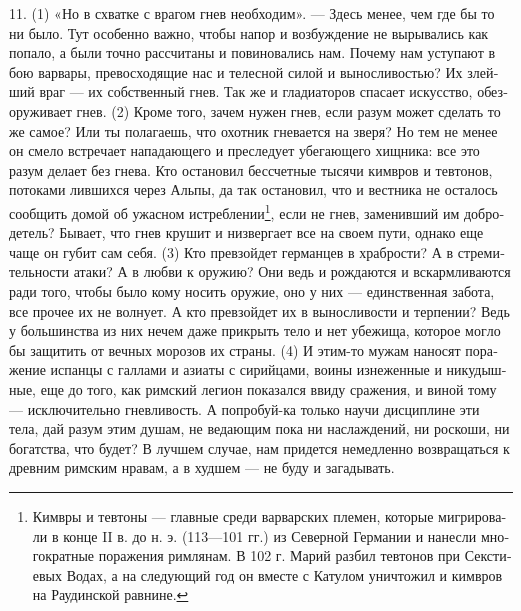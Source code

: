 11. (1) «Но в схват­ке с вра­гом гнев необ­хо­дим». --- Здесь менее, чем где бы то ни было. Тут осо­бен­но важ­но, чтобы напор и воз­буж­де­ние не выры­ва­лись как попа­ло, а были точ­но рас­счи­та­ны и пови­но­ва­лись нам. Поче­му нам усту­па­ют в бою вар­ва­ры, пре­вос­хо­дя­щие нас и телес­ной силой и вынос­ли­во­стью? Их злей­ший враг --- их соб­ст­вен­ный гнев. Так же и гла­ди­а­то­ров спа­са­ет искус­ство, обез­ору­жи­ва­ет гнев. (2) Кро­ме того, зачем нужен гнев, если разум может сде­лать то же самое? Или ты пола­га­ешь, что охот­ник гне­ва­ет­ся на зве­ря? Но тем не менее он сме­ло встре­ча­ет напа­даю­ще­го и пре­сле­ду­ет убе­гаю­ще­го хищ­ни­ка: все это разум дела­ет без гне­ва. Кто оста­но­вил бес­счет­ные тыся­чи ким­вров и тев­то­нов, пото­ка­ми лив­ших­ся через Аль­пы, да так оста­но­вил, что и вест­ни­ка не оста­лось сооб­щить домой об ужас­ном истреблении\footnote{Ким­вры и тев­то­ны — глав­ные сре­ди вар­вар­ских пле­мен, кото­рые мигри­ро­ва­ли в кон­це II в. до н. э. (113—101 гг.) из Север­ной Гер­ма­нии и нанес­ли мно­го­крат­ные пора­же­ния рим­ля­нам. В 102 г. Марий раз­бил тев­то­нов при Секс­ти­е­вых Водах, а на сле­дую­щий год он вме­сте с Кату­лом уни­что­жил и ким­вров на Раудин­ской рав­нине.}, если не гнев, заме­нив­ший им доб­ро­де­тель? Быва­ет, что гнев кру­шит и низ­вер­га­ет все на сво­ем пути, одна­ко еще чаще он губит сам себя. (3) Кто пре­взой­дет гер­ман­цев в храб­ро­сти? А в стре­ми­тель­но­сти ата­ки? А в люб­ви к ору­жию? Они ведь и рож­да­ют­ся и вскарм­ли­ва­ют­ся ради того, чтобы было кому носить ору­жие, оно у них --- един­ст­вен­ная забота, все про­чее их не вол­ну­ет. А кто пре­взой­дет их в вынос­ли­во­сти и тер­пе­нии? Ведь у боль­шин­ства из них нечем даже при­крыть тело и нет убе­жи­ща, кото­рое мог­ло бы защи­тить от веч­ных моро­зов их стра­ны. (4) И этим-то мужам нано­сят пора­же­ние испан­цы с гал­ла­ми и ази­а­ты с сирий­ца­ми, вои­ны изне­жен­ные и никудыш­ные, еще до того, как рим­ский леги­он пока­зал­ся ввиду сра­же­ния, и виной тому --- исклю­чи­тель­но гнев­ли­вость. А попро­буй-ка толь­ко научи дис­ци­плине эти тела, дай разум этим душам, не ведаю­щим пока ни наслаж­де­ний, ни рос­ко­ши, ни богат­ства, что будет? В луч­шем слу­чае, нам при­дет­ся немед­лен­но воз­вра­щать­ся к древним рим­ским нра­вам, а в худ­шем --- не буду и зага­ды­вать.

